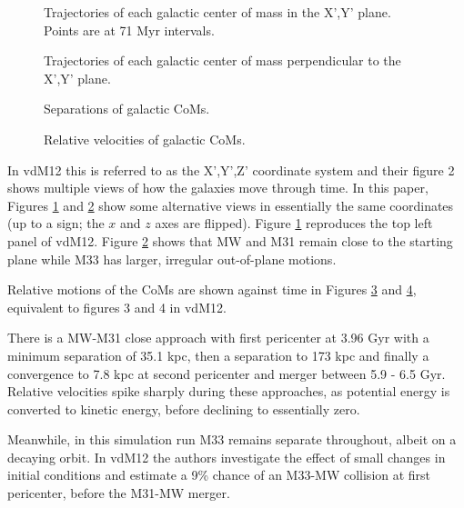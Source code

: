 \documentclass[twocolumn]{aastex63}
\begin{document}
\begin{figure}[htb!]
	\caption{Trajectories of each galactic center of mass in the X',Y' plane. Points are at 71 Myr intervals.
		\label{fig:traj_xy}}
\end{figure}

\begin{figure}[htb!]
	\caption{Trajectories of each galactic center of mass perpendicular to the X',Y' plane.
		\label{fig:traj_z}}
\end{figure}

\begin{figure}[hbt!]
	\caption{Separations of galactic CoMs.
		\label{fig:rel_sep}}
\end{figure}

\begin{figure}[hbt!]
	\caption{Relative velocities of galactic CoMs.
		\label{fig:rel_vel}}
\end{figure}


In vdM12 this is referred to as the X',Y',Z' coordinate system and their figure 2 shows multiple views of how the galaxies move through time. In this paper, Figures \ref{fig:traj_xy} and  \ref{fig:traj_z} show some alternative views in essentially the same coordinates (up to a sign; the $x$ and $z$ axes are flipped). Figure \ref{fig:traj_xy} reproduces the top left panel of vdM12. Figure \ref{fig:traj_z} shows that MW and M31 remain close to the starting plane while M33 has larger, irregular out-of-plane motions.

Relative motions of the CoMs are shown against time in Figures \ref{fig:rel_sep} and \ref{fig:rel_vel}, equivalent to figures 3 and 4 in vdM12.


There is a MW-M31 close approach with first pericenter at 3.96 Gyr with a minimum separation of 35.1 kpc, then a separation to 173 kpc and finally a convergence to 7.8 kpc at second pericenter and merger between 5.9 - 6.5 Gyr. Relative velocities spike sharply during these approaches, as potential energy is converted to kinetic energy, before declining to essentially zero.

Meanwhile, in this simulation run M33 remains separate throughout, albeit on a decaying orbit. In vdM12 the authors investigate the effect of small changes in initial conditions and estimate a 9\% chance of an M33-MW collision at first pericenter, before the M31-MW merger.
\end{document}
